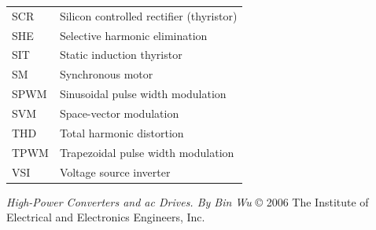 \documentclass[letterpaper,12pt]{article}
\begin{document}
\begin{flushleft}
\begin{tabular}{ll}
SCR & Silicon controlled rectifier (thyristor) \\
SHE & Selective harmonic elimination \\
SIT & Static induction thyristor \\
SM & Synchronous motor \\
SPWM & Sinusoidal pulse width modulation \\
SVM & Space-vector modulation \\
THD & Total harmonic distortion \\
TPWM & Trapezoidal pulse width modulation \\
VSI & Voltage source inverter \\
\end{tabular}
\end{flushleft}

\begin{flushright}
\textit{High-Power Converters and ac Drives. By Bin Wu}
\newline
© 2006 The Institute of Electrical and Electronics Engineers, Inc.
\end{flushright}
\end{document}
